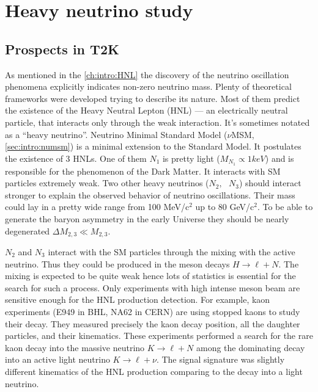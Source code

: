 \documentclass[../main.tex]{subfiles}
\begin{document}
\renewcommand{\labelitemi}{\ding{226}}
\renewcommand{\labelitemii}{\ding{227}}

\part{Heavy neutrino study}

\chapter{Prospects in T2K}
\label{ch:hnl}

As mentioned in the \autoref{ch:intro:HNL} the discovery of the neutrino oscillation phenomena explicitly indicates non-zero neutrino mass. Plenty of theoretical frameworks were developed trying to describe its nature. Most of them predict the existence of the Heavy Neutral Lepton (HNL) --- an electrically neutral particle, that interacts only through the weak interaction. It's sometimes notated as a ``heavy neutrino''. Neutrino Minimal Standard Model ($\nu$MSM, \autoref{sec:intro:numsm}) is a minimal extension to the Standard Model. It postulates the existence of 3 HNLs. One of them $N_1$ is pretty light ($M_{N_1}\propto1keV$) and is responsible for the phenomenon of the Dark Matter. It interacts with SM particles extremely weak. Two other heavy neutrinos ($N_2,\text{ }N_3$) should interact stronger to explain the observed behavior of neutrino oscillations. Their mass could lay in a pretty wide range from 100 MeV/$\text{c}^2$ up to 80 GeV/$\text{c}^2$. To be able to generate the baryon asymmetry in the early Universe they should be nearly degenerated $\Delta M_{2,3}\ll M_{2,3}$.

$N_2$ and $N_3$ interact with the SM particles through the mixing with the active neutrino. Thus they could be produced in the meson decays $H\to\ell+N$. The mixing is expected to be quite weak hence lots of statistics is essential for the search for such a process. Only experiments with high intense meson beam are sensitive enough for the HNL production detection. For example, kaon experiments (E949 in BHL, NA62 in CERN) are using stopped kaons to study their decay. They measured precisely the kaon decay position, all the daughter particles, and their kinematics. These experiments performed a search for the rare kaon decay into the massive neutrino $K\to\ell+N$ among the dominating decay into an active light neutrino $K\to\ell+\nu$. The signal signature was slightly different kinematics of the HNL production comparing to the decay into a light neutrino.
\end{document}
